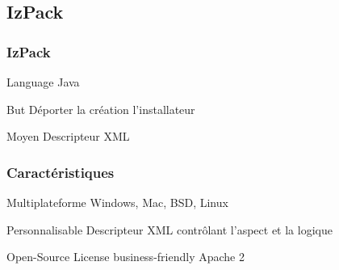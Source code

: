 \subsection{IzPack}
\begin{frame}\frametitle{IzPack}
\begin{minipage}[c]{.46\linewidth}
	\begin{beamerboxesrounded}[shadow=true]{Language}
		Java
	\end{beamerboxesrounded}
\end{minipage}
\hfill
\begin{minipage}[c]{.46\linewidth}
	\begin{beamerboxesrounded}[shadow=true]{But}
		Déporter la création l'installateur
	\end{beamerboxesrounded}
\end{minipage}
\vfill
\hfil
\begin{minipage}[c]{.46\linewidth}
	\begin{beamerboxesrounded}[shadow=true]{Moyen}
	Descripteur XML
	\end{beamerboxesrounded}
\end{minipage}
\end{frame}
\begin{frame}\frametitle{Caractéristiques}
	\begin{beamerboxesrounded}[shadow=true]{Multiplateforme}
	Windows, Mac, BSD, Linux
	\end{beamerboxesrounded}
	\vfill
	\begin{beamerboxesrounded}[shadow=true]{Personnalisable}
	Descripteur XML contrôlant l'aspect et la logique
	\end{beamerboxesrounded}
	\vfill
	\begin{beamerboxesrounded}[shadow=true]{Open-Source}
	License business-friendly Apache 2
	\end{beamerboxesrounded}
\end{frame}

